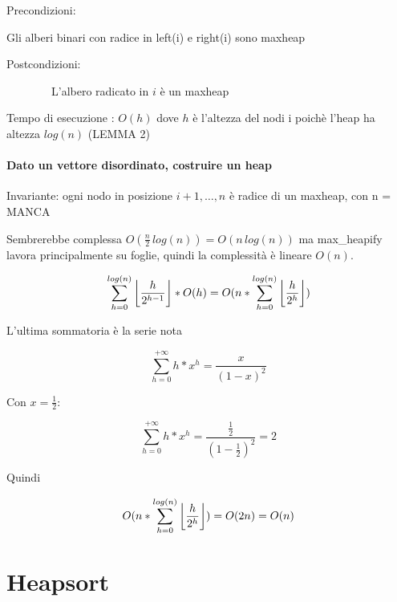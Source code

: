 {Precondizioni:}

{Gli alberi binari con radice in left(i) e right(i) sono maxheap}

{Postcondizioni:}

{~~~~~~~~L'albero radicato in $i$ è un maxheap}



{Tempo di esecuzione : $O(h)$ dove $h$ è l'altezza del nodi i poichè l'heap ha altezza $log(n)$ (LEMMA 2)}

\paragraph{Dato un vettore disordinato, costruire un heap}



{Invariante: ogni nodo in posizione $i+1,\ldots,n$ è radice di un maxheap, con n = MANCA}

{Sembrerebbe complessa $O(\frac{n}{2}\,log(n)) = O(n\,log(n))$ ma max\_heapify lavora principalmente su foglie, quindi la complessità è lineare $O(n)$.}

\begin{equation}
\sum_{h=0}^{log(n)}{\floor*{\frac{h}{2^{h-1}}}*O(h)} = O(n*\sum_{h=0}^{log(n)}{\floor*{\frac{h}{2^h}})}
\end{equation}

{L'ultima sommatoria è la serie nota}

\begin{equation}
\sum_{h=0}^{+\infty}{h*x^h} = \frac{x}{{(1-x)}^2}
\end{equation}

{Con $x=\frac{1}{2}$:}

\begin{equation}
\sum_{h=0}^{+\infty}{h*x^h} = \frac{\frac{1}{2}}{{(1-\frac{1}{2})}^2} = 2
\end{equation}

{Quindi}

\begin{equation}
O(n*\sum_{h=0}^{log(n)}{\floor*{\frac{h}{2^h}}}) = O(2n) = O(n)
\end{equation}

\section{Heapsort}



